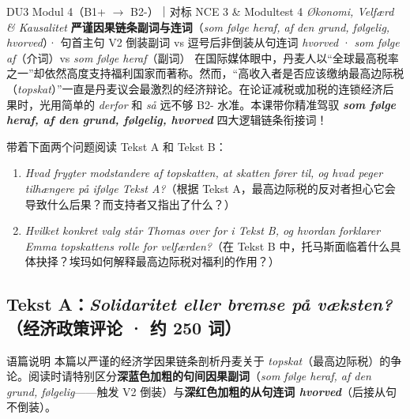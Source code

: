 {DU3 Modul 4（B1+ $\rightarrow$ B2-）｜对标 NCE 3 \& Modultest 4 \textit{Økonomi, Velfærd \& Kausalitet}}
{\textbf{严谨因果链条副词与连词}（\textit{som følge heraf, af den grund, følgelig, hvorved}）· 句首主句 V2 倒装副词 vs 逗号后非倒装从句连词 \textit{hvorved} · \textit{som følge af}（介词）vs \textit{som følge heraf}（副词）}
{在国际媒体眼中，丹麦人以“全球最高税率之一”却依然高度支持福利国家而著称。然而，“高收入者是否应该缴纳最高边际税（\textit{topskat}）”一直是丹麦议会最激烈的经济辩论。在论证减税或加税的连锁经济后果时，光用简单的 \textit{derfor} 和 \textit{så} 远不够 B2- 水准。本课带你精准驾驭 \textbf{\textit{som følge heraf, af den grund, følgelig, hvorved}} 四大逻辑链条衔接词！}

\begin{foerduleaeser}
带着下面两个问题阅读 Tekst A 和 Tekst B：
\begin{enumerate}
  \item \textit{Hvad frygter modstandere af topskatten, at skatten fører til, og hvad peger tilhængere på ifølge Tekst A?}（根据 Tekst A，最高边际税的反对者担心它会导致什么后果？而支持者又指出了什么？）
  \item \textit{Hvilket konkret valg står Thomas over for i Tekst B, og hvordan forklarer Emma topskattens rolle for velfærden?}（在 Tekst B 中，托马斯面临着什么具体抉择？埃玛如何解释最高边际税对福利的作用？）
\end{enumerate}
\end{foerduleaeser}


\subsection*{Tekst A：\textit{Solidaritet eller bremse på væksten?}（经济政策评论 · 约 250 词）}

\begin{tipbox}{语篇说明}
本篇以严谨的经济学因果链条剖析丹麦关于 \textit{topskat}（最高边际税）的争论。阅读时请特别区分\textbf{\color{NCDNavy}深蓝色加粗的句间因果副词}（\textit{som følge heraf, af den grund, følgelig}——触发 V2 倒装）与\textbf{\color{NCDRed}深红色加粗的从句连词 \textit{hvorved}}（后接从句不倒装）。
\end{tipbox}

